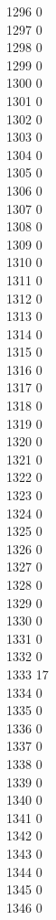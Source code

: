 { 1296	0 \\
 1297	0 \\
 1298	0 \\
 1299	0 \\
 1300	0 \\
 1301	0 \\
 1302	0 \\
 1303	0 \\
 1304	0 \\
 1305	0 \\
 1306	0 \\
 1307	0 \\
 1308	0 \\
 1309	0 \\
 1310	0 \\
 1311	0 \\
 1312	0 \\
 1313	0 \\
 1314	0 \\
 1315	0 \\
 1316	0 \\
 1317	0 \\
 1318	0 \\
 1319	0 \\
 1320	0 \\
 1321	0 \\
 1322	0 \\
 1323	0 \\
 1324	0 \\
 1325	0 \\
 1326	0 \\
 1327	0 \\
 1328	0 \\
 1329	0 \\
 1330	0 \\
 1331	0 \\
 1332	0 \\
 1333	17 \\
 1334	0 \\
 1335	0 \\
 1336	0 \\
 1337	0 \\
 1338	0 \\
 1339	0 \\
 1340	0 \\
 1341	0 \\
 1342	0 \\
 1343	0 \\
 1344	0 \\
 1345	0 \\
 1346	0 \\
}
